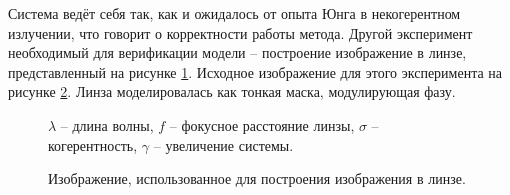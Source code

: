 Система ведёт себя так, как и ожидалось от опыта Юнга в некогерентном излучении, что говорит о корректности работы метода. Другой эксперимент необходимый для верификации модели -- построение изображение в линзе, представленный на рисунке \ref{ris:Lenses}. Исходное изображение для этого эксперимента на рисунке \ref{ris:LensImage}. Линза моделировалась как тонкая маска, модулирующая фазу.
\begin{figure}[!htbp]
	\caption{$\lambda$ -- длина волны, $f$ -- фокусное расстояние линзы, $\sigma$ -- когерентность, $\gamma$ -- увеличение системы.}
	\label{ris:Lenses}
\end{figure}
\begin{figure}[htbp]
	\caption{Изображение, использованное для построения изображения в линзе.}
	\label{ris:LensImage}
\end{figure}
